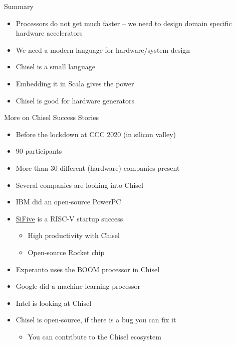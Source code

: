 \begin{frame}[fragile]{Summary}
\begin{itemize}
\item Processors do not get much faster -- we need to design domain specific hardware accelerators
\item We need a modern language for hardware/system design
\item Chisel is a small language
\item Embedding it in Scala gives the power
\item Chisel is good for hardware generators
\end{itemize}
\end{frame}

\begin{frame}[fragile]{More on Chisel Success Stories}
\begin{itemize}
\item Before the lockdown at CCC 2020 (in silicon valley)
\item 90 participants
\item More than 30 different (hardware) companies present
\item Several companies are looking into Chisel
\item IBM did an open-source PowerPC
\item \href{https://www.sifive.com/}{SiFive} is a RISC-V startup success
\begin{itemize}
\item High productivity with Chisel
\item Open-source Rocket chip
\end{itemize}
\item Experanto uses the BOOM processor in Chisel
\item Google did a machine learning processor
\item Intel is looking at Chisel
\item Chisel is open-source, if there is a bug you can fix it
\begin{itemize}
\item You can contribute to the Chisel ecosystem
\end{itemize}
\end{itemize}
\end{frame}

